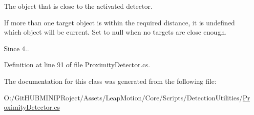 The object that is close to the activated detector.

If more than one target object is within the required distance, it is undefined which object will be current. Set to null when no targets are close enough. \begin{DoxySince}{Since}
4.. 
\end{DoxySince}


Definition at line 91 of file Proximity\+Detector.\+cs.



The documentation for this class was generated from the following file\+:\begin{DoxyCompactItemize}
\item 
O\+:/\+Git\+H\+U\+B\+M\+I\+N\+I\+P\+Roject/\+Assets/\+Leap\+Motion/\+Core/\+Scripts/\+Detection\+Utilities/\mbox{\hyperlink{_proximity_detector_8cs}{Proximity\+Detector.\+cs}}\end{DoxyCompactItemize}

